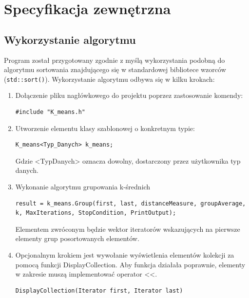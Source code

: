 \section{Specyfikacja zewnętrzna}

\subsection{Wykorzystanie algorytmu}

Program został przygotowany zgodnie z myślą wykorzystania podobną do algorytmu sortowania znajdującego się w standardowej bibliotece wzorców (\texttt{std::sort()}). Wykorzystanie algorytmu odbywa się w kilku krokach:

\begin{enumerate}
	\item Dołączenie pliku nagłówkowego do projektu poprzez zastosowanie komendy:
	
	\begin{lstlisting}
#include "K_means.h"
	\end{lstlisting}
	
	\item Utworzenie elementu klasy szablonowej o konkretnym typie:
	
	\begin{lstlisting}
K_means<Typ_Danych> k_means;
	\end{lstlisting}

	Gdzie <Typ\textunderscore Danych> oznacza dowolny, dostarczony przez użytkownika typ danych.
	
	\item Wykonanie algorytmu grupowania k-średnich
	\begin{lstlisting}	
result = k_means.Group(first, last, distanceMeasure, groupAverage, k, MaxIterations, StopCondition, PrintOutput);
	\end{lstlisting}
	
	Elementem zwróconym będzie wektor iteratorów wskazujących na pierwsze elementy grup posortowanych elementów.
	
	\item Opcjonalnym krokiem jest wywołanie wyświetlenia elementów kolekcji za pomocą funkcji DisplayCollection. Aby funkcja działała poprawnie, elementy w zakresie muszą implementować operator <<.
	\begin{lstlisting}	
DisplayCollection(Iterator first, Iterator last)
	\end{lstlisting}
\end{enumerate}

